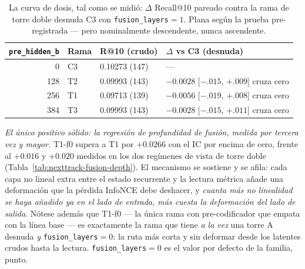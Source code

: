 \documentclass[11pt]{article}
\begin{document}
\begin{table}[ht]
  \centering
  \caption{La curva de dosis, tal como se midió: $\Delta$ Recall@10 pareado
  contra la rama de torre doble desnuda C3 con
  \texttt{fusion\_layers}${}=1$. Plana según la prueba pre-registrada --- pero
  nominalmente descendente, nunca ascendente.}
  \label{tab:nexttrack-preencoder-dose}
  {\footnotesize\setlength{\tabcolsep}{6pt}\begin{tabular}{rlll}
    \toprule
    \texttt{pre\_hidden\_b} & Rama & R@10 (crudo) & $\Delta$ vs C3 (desnuda) \\
    \midrule
    0 & C3 & 0.10273 (147) & --- \\
    128 & T2 & 0.09993 (143) & $-0.0028$ [$-.015$, $+.009$] cruza cero \\
    256 & T1 & 0.09713 (139) & $-0.0056$ [$-.019$, $+.008$] cruza cero \\
    384 & T3 & 0.09993 (143) & $-0.0028$ [$-.015$, $+.011$] cruza cero \\
    \bottomrule
  \end{tabular}}
\end{table}

\emph{El único positivo sólido: la regresión de profundidad de fusión, medida por
tercera vez y mayor.} T1-f0 supera a T1 por $+\num{0.0266}$ con el IC por encima
de cero, frente al $+\num{0.016}$ y $+\num{0.020}$ medidos en los dos regímenes de
vista de torre doble (Tabla~\ref{tab:nexttrack-fusion-depth}). El mecanismo se sostiene y
se afila: cada capa no lineal extra entre el estado recurrente y la lectura
métrica añade una deformación que la pérdida InfoNCE debe deshacer, y \emph{cuanta
más no linealidad se haya añadido ya en el lado de entrada, más cuesta la
deformación del lado de salida}. Nótese además que T1-f0 --- la única rama con
pre-codificador que empata con la línea base --- es exactamente la rama que tiene
\emph{a la vez} una torre A desnuda \emph{y} \texttt{fusion\_layers}${}=0$: la
ruta más corta y sin deformar desde los latentes crudos hasta la lectura.
\texttt{fusion\_layers}${}=0$ es el valor por defecto de la familia, punto.
\end{document}
